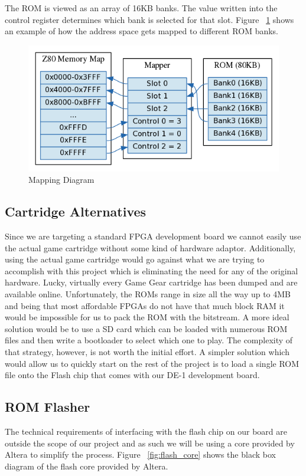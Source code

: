 \documentclass{article}
\begin{document}
The ROM is viewed as an array of 16KB banks. The value written into 
the control register determines which bank is selected for 
that slot. Figure ~\ref{fig:mapping_diagram} shows an example of 
how the address space gets mapped to different ROM banks.

\begin{figure}[H]
\centering
\includegraphics[scale=0.4]{mapper.png}
\caption{Mapping Diagram}
\label{fig:mapping_diagram}
\end{figure}

\subsection{Cartridge Alternatives}
Since we are targeting a standard FPGA development board we cannot
easily use the actual game cartridge without some kind of hardware adaptor.
Additionally, using the actual game cartridge would go
against what we are trying to accomplish with this project which is
eliminating the need for any of the original hardware. Lucky, virtually
every Game Gear cartridge has been dumped and are available online.
Unfortunately, the ROMs range in size all the way up to 4MB and being that
most affordable FPGAs do not have that much block RAM it would be
impossible for us to pack the ROM with the bitstream. A more ideal
solution would be to use a SD card which can be loaded with numerous
ROM files and then write a bootloader to select which one to play.
The complexity of that strategy, however, is not worth the initial
effort. A simpler solution which would allow us to quickly start on the
rest of the project is to load a single ROM file onto the Flash chip
that comes with our DE-1 development board.

\subsection{ROM Flasher}
The technical requirements of interfacing with the flash chip on our board
are outside the scope of our project and as such we will be using
a core provided by Altera \cite{flash_core} to simplify the process.
Figure ~\ref{fig:flash_core} shows the black box diagram of the flash core provided
by Altera.
\end{document}
